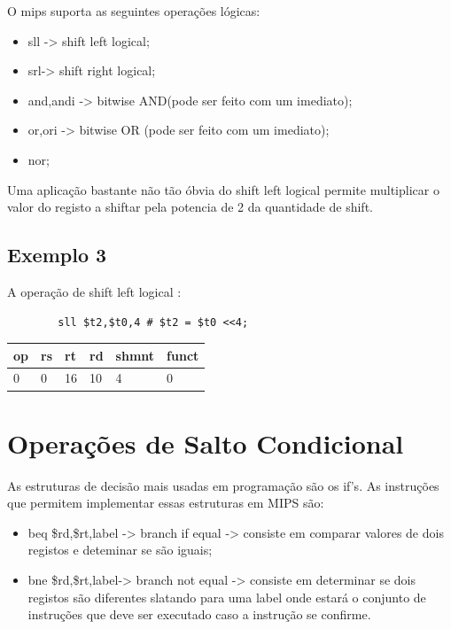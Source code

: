 \documentclass[10pt,a4paper]{book}
\begin{document}
	    O mips suporta as seguintes operações lógicas:
	      \begin{itemize}
	       \item sll -> shift left logical;
	       \item srl-> shift right logical;
	       \item and,andi -> bitwise AND(pode ser feito com um imediato);
	       \item or,ori   -> bitwise OR (pode ser feito com um imediato);
	       \item nor;
	      \end{itemize}

	      Uma aplicação bastante não tão óbvia do shift left logical permite multiplicar o valor do registo a shiftar pela potencia de 2 da quantidade de shift.

	    \subsection{Exemplo 3}

	      A operação de shift left logical :

	      \begin{lstlisting}
		sll $t2,$t0,4 # $t2 = $t0 <<4;
	      \end{lstlisting}

	      \begin{center}
\begin{tabular}{|l|l|l|l|l|l|}\hline
op & rs & rt & rd & shmnt & funct\\\hline
0 & 0 & 16 & 10 & 4 & 0\\\hline
	      \end{tabular}
	      \end{center}


  \section{Operações de Salto Condicional}

  As estruturas de decisão mais usadas em programação são os if's. As instruções que permitem implementar essas estruturas em MIPS são:
    \begin{itemize}
     \item beq \$rd,\$rt,label -> branch if equal -> consiste em comparar valores de dois registos e deteminar se são iguais;
     \item bne \$rd,\$rt,label-> branch not equal -> consiste em determinar se dois registos são diferentes slatando para uma label onde estará o conjunto de instruções que deve ser executado caso a instrução se confirme.
    \end{itemize}
\end{document}
